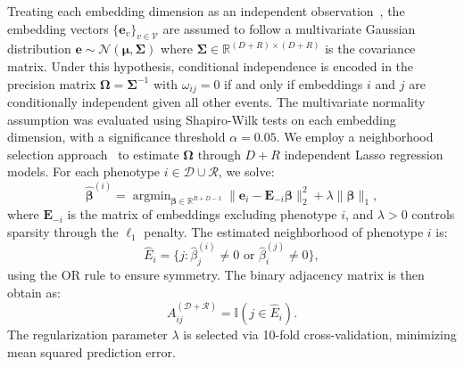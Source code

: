 Treating each embedding dimension as an independent observation~\citet{zhelezniak2019correlation}, the embedding vectors $\{\mathbf{e}_v\}_{v \in \mathcal{V}}$ are assumed to follow a multivariate Gaussian distribution $
\mathbf{e} \sim \mathcal{N}(\boldsymbol{\mu}, \boldsymbol{\Sigma})
$
where $\boldsymbol{\Sigma} \in \mathbb{R}^{(D+R) \times (D+R)}$ is the covariance matrix. Under this hypothesis, conditional independence is encoded in the precision matrix $\boldsymbol{\Omega} = \boldsymbol{\Sigma}^{-1}$ with $\omega_{ij} = 0$ if and only if embeddings $i$ and $j$ are conditionally independent given all other events. The multivariate normality assumption was evaluated using Shapiro-Wilk tests on each embedding dimension, with a significance threshold $\alpha = 0.05$. We employ a neighborhood selection approach~\citet{meinshausen2006high} to estimate $\boldsymbol{\Omega}$ through $D+R$ independent Lasso regression models. For each phenotype $i \in \mathcal{D \cup R}$, we solve:
\begin{equation}\label{eq:neighborhood_selection}
\hat{\boldsymbol{\beta}}^{(i)} = \mathop{\arg \min}_{\boldsymbol{\beta} \in \mathbb{R}^{R+D-1}} \|\mathbf{e}_i - \mathbf{E}_{-i}\boldsymbol{\beta}\|_2^2 + \lambda \|\boldsymbol{\beta}\|_1,
\end{equation}
where $\mathbf{E}_{-i}$ is the matrix of embeddings excluding phenotype $i$, and $\lambda > 0$ controls sparsity through the $\ell_1$ penalty. The estimated neighborhood of phenotype $i$ is:
\begin{equation}
\hat{E}_i = \{j : \hat{\beta}_j^{(i)} \neq 0 \text{ or } \hat{\beta}_i^{(j)} \neq 0\},
\end{equation}
using the OR rule to ensure symmetry. The binary adjacency matrix is then obtain as:
\begin{equation}\label{eq:ggm_adjacency}
A_{ij}^{\mathcal{(D+R)}} = \mathbb{I}(j \in \hat{E}_i).
\end{equation}
The regularization parameter $\lambda$ is selected via 10-fold cross-validation, minimizing mean squared prediction error.


